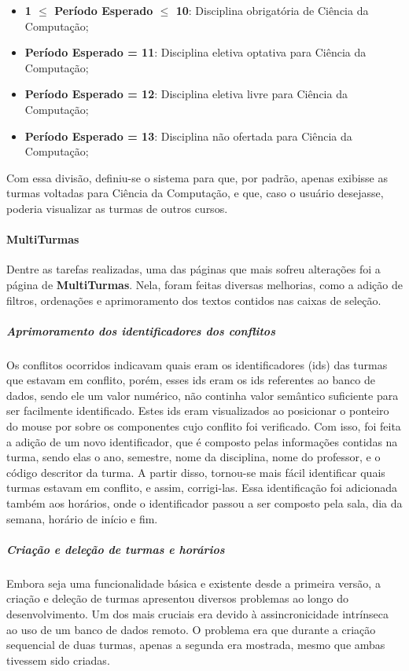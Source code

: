 \begin{itemize}
  \item \textbf{1 $\leq$ Período Esperado $\leq$ 10}: Disciplina obrigatória de Ciência da Computação;
  \item \textbf{Período Esperado = 11}: Disciplina eletiva optativa para Ciência da Computação;
  \item \textbf{Período Esperado = 12}: Disciplina eletiva livre para Ciência da Computação;
  \item \textbf{Período Esperado = 13}: Disciplina não ofertada para Ciência da Computação;
\end{itemize}

Com essa divisão, definiu-se o sistema para que, por padrão, apenas exibisse as turmas voltadas para Ciência da Computação, e que, caso o usuário desejasse, poderia visualizar as turmas de outros cursos.

\paragraph*{MultiTurmas}

Dentre as tarefas realizadas, uma das páginas que mais sofreu alterações foi a página de \textbf{MultiTurmas}. Nela, foram feitas diversas melhorias, como a adição de filtros, ordenações e aprimoramento dos textos contidos nas caixas de seleção.

\subparagraph*{Aprimoramento dos identificadores dos conflitos}

Os conflitos ocorridos indicavam quais eram os identificadores (ids) das turmas que estavam em conflito, porém, esses ids eram os ids referentes ao banco de dados, sendo ele um valor numérico, não continha valor semântico suficiente para ser facilmente identificado. Estes ids eram visualizados ao posicionar o ponteiro do mouse por sobre os componentes cujo conflito foi verificado. Com isso, foi feita a adição de um novo identificador, que é composto pelas informações contidas na turma, sendo elas o ano, semestre, nome da disciplina, nome do professor, e o código descritor da turma. A partir disso, tornou-se mais fácil identificar quais turmas estavam em conflito, e assim, corrigi-las. Essa identificação foi adicionada também aos horários, onde o identificador passou a ser composto pela sala, dia da semana, horário de início e fim.

\subparagraph*{Criação e deleção de turmas e horários}

Embora seja uma funcionalidade básica e existente desde a primeira versão, a criação e deleção de turmas apresentou diversos problemas ao longo do desenvolvimento. Um dos mais cruciais era devido à assincronicidade intrínseca ao uso de um banco de dados remoto. O problema era que durante a criação sequencial de duas turmas, apenas a segunda era mostrada, mesmo que ambas tivessem sido criadas.

